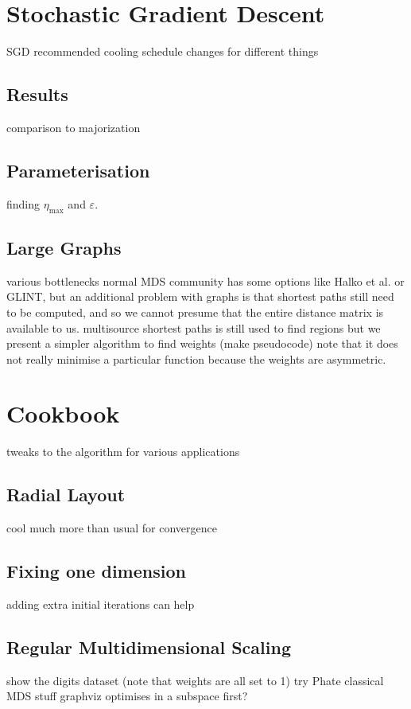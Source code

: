 \section{Stochastic Gradient Descent}
SGD
recommended cooling schedule changes for different things
\subsection{Results}
comparison to majorization
\subsection{Parameterisation}
finding $\eta_{\max}$ and $\varepsilon$.
\subsection{Large Graphs}
various bottlenecks
normal MDS community has some options like Halko et al. or GLINT, but an additional problem with graphs is that shortest paths still need to be computed, and so we cannot presume that the entire distance matrix is available to us.
multisource shortest paths is still used to find regions
but we present a simpler algorithm to find weights (make pseudocode)
note that it does not really minimise a particular function because the weights are asymmetric.

\section{Cookbook}
tweaks to the algorithm for various applications
\subsection{Radial Layout}
cool much more than usual for convergence
\subsection{Fixing one dimension}
adding extra initial iterations can help
\subsection{Regular Multidimensional Scaling}
show the digits dataset (note that weights are all set to 1)
try Phate classical MDS stuff
graphviz optimises in a subspace first?